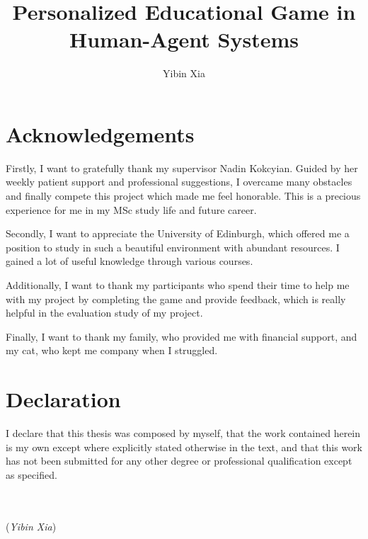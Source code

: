 \documentclass[msc,deptreport,ai]{infthesis}      %
\begin{document}
\begin{preliminary}

\title{Personalized Educational Game in Human-Agent Systems}

\author{Yibin Xia}


\maketitle

\section*{Acknowledgements}
Firstly, I want to gratefully thank my supervisor Nadin Kokcyian. Guided by her weekly patient support and professional suggestions, I overcame many obstacles and finally compete this project which made me feel honorable. This is a precious experience for me in my MSc study life and future career.

Secondly, I want to appreciate the University of Edinburgh, which offered me a position to study in such a beautiful environment with abundant resources. I gained a lot of useful knowledge through various courses.

Additionally, I want to thank my participants who spend their time to help me with my project by completing the game and provide feedback, which is really helpful in the evaluation study of my project.

Finally, I want to thank my family, who provided me with financial support, and my cat, who kept me company when I struggled.

\clearpage

{\centering\section*{Declaration}}
I declare that this thesis was composed by myself, that the work contained herein is
my own except where explicitly stated otherwise in the text, and that this work has not
been submitted for any other degree or professional qualification except as specified.

~\\
~\\
\flushright
(\textit{Yibin Xia})


\tableofcontents
\end{preliminary}
\end{document}
